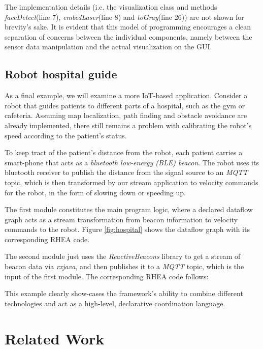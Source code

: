 \documentclass[sigplan,review,anonymous]{acmart}
\begin{document}
The implementation details (i.e. the visualization class and methods
\textit{faceDetect}(line 7), \textit{embedLaser}(line 8) and
\textit{toGray}(line 26)) are not shown for brevity's sake. It is evident that
this model of programming encourages a clean separation of concerns between the
individual components, namely between the sensor data manipulation and the
actual visualization on the GUI.

\subsection{Robot hospital guide}

As a final example, we will examine a more IoT-based application. Consider a
robot that guides patients to different parts of a hospital, such as the gym or
cafeteria. Assuming map localization, path finding and obstacle avoidance are
already implemented, there still remains a problem with calibrating the robot's
speed according to the patient's status.

To keep tract of the patient's distance from the robot, each patient carries a
smart-phone that acts as a \textit{bluetooth low-energy (BLE) beacon}. The robot
uses its bluetooth receiver to publish the distance from the signal source to an
\textit{MQTT} topic, which is then transformed by our stream application to
velocity commands for the robot, in the form of slowing down or speeding up.

The first module constitutes the main program logic, where a declared dataflow
graph acts as a stream transformation from beacon information to velocity
commands to the robot. Figure \ref{fig:hospital} shows the dataflow graph with
its corresponding \textsc{RHEA} code.


The second module just uses the \textit{ReactiveBeacons}
library to get a stream of
beacon data via \textit{rxjava}, and then publishes it to a \textit{MQTT} topic,
which is the input of the first module. The corresponding \textsc{RHEA} code
follows:

This example clearly show-cases the framework's ability to combine different
technologies and act as a high-level, declarative coordination language.

\section{Related Work} \label{sec:related}
\end{document}

